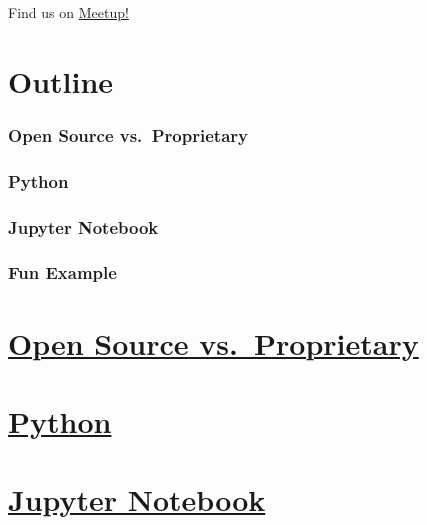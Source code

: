 \documentclass[11pt]{article}
\begin{document}
Find us on \href{https://www.meetup.com/MaptimeSEA}{Meetup!}

    \hypertarget{outline}{%
\section{Outline}\label{outline}}

    \hypertarget{open-source-vs.-proprietary}{%
\subsubsection{Open Source
vs.~Proprietary}\label{open-source-vs.-proprietary}}

    \hypertarget{python}{%
\subsubsection{Python}\label{python}}

    \hypertarget{jupyter-notebook}{%
\subsubsection{Jupyter Notebook}\label{jupyter-notebook}}

    \hypertarget{fun-example}{%
\subsubsection{Fun Example}\label{fun-example}}

    \hypertarget{open-source-vs.-proprietary}{%
\section{\texorpdfstring{\href{https://opensource.com/resources/what-open-source}{Open
Source
vs.~Proprietary}}{Open Source vs.~Proprietary}}\label{open-source-vs.-proprietary}}

    \hypertarget{python}{%
\section{\texorpdfstring{\href{https://www.python.org/about/}{Python}}{Python}}\label{python}}

    \hypertarget{jupyter-notebook}{%
\section{\texorpdfstring{\href{https://jupyter.org/}{Jupyter
Notebook}}{Jupyter Notebook}}\label{jupyter-notebook}}
\end{document}
